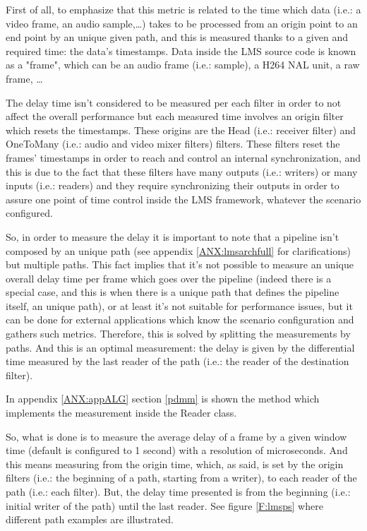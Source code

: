 First of all, to emphasize that this metric is related to the time which data (i.e.: a video frame, an audio sample,\ldots) takes to be processed from an origin point to an end point by an unique given path, and this is measured thanks to a given and required time: the data's timestamps. Data inside the LMS source code is known as a "frame", which can be an audio frame (i.e.: sample), a H264 NAL unit, a raw frame, \ldots 

The delay time isn't considered to be measured per each filter in order to not affect the overall performance but each measured time involves an origin filter which resets the timestamps. These origins are the Head (i.e.: receiver filter) and OneToMany (i.e.: audio and video mixer filters) filters. These filters reset the frames' timestamps in order to reach and control an internal synchronization, and this is due to the fact that these filters have many outputs (i.e.: writers) or many inputs (i.e.: readers) and they require synchronizing their outputs in order to assure one point of time control inside the LMS framework, whatever the scenario configured.

So, in order to measure the delay it is important to note that a pipeline isn't composed by an unique path (see appendix \ref{ANX:lmsarchfull} for clarifications) but multiple paths. This fact implies that it's not possible to measure an unique overall delay time per frame which goes over the pipeline (indeed there is a special case, and this is when there is a unique path that defines the pipeline itself, an unique path), or at least it's not suitable for performance issues, but it can be done for external applications which know the scenario configuration and gathers such metrics. Therefore, this is solved by splitting the measurements by paths. And this is an optimal measurement: the delay is given by the differential time measured by the last reader of the path (i.e.: the reader of the destination filter).

In appendix \ref{ANX:appALG} section \ref{pdmm} is shown the method which implements the measurement inside the Reader class.

So, what is done is to measure the average delay of a frame by a given window time (default is configured to 1 second) with a resolution of microseconds. And this means measuring from the origin time, which, as said, is set by the origin filters (i.e.: the beginning of a path, starting from a writer), to each reader of the path (i.e.: each filter). But, the delay time presented is from the beginning (i.e.: initial writer of the path) until the last reader. See figure \ref{F:lmsps} where different path examples are illustrated.

